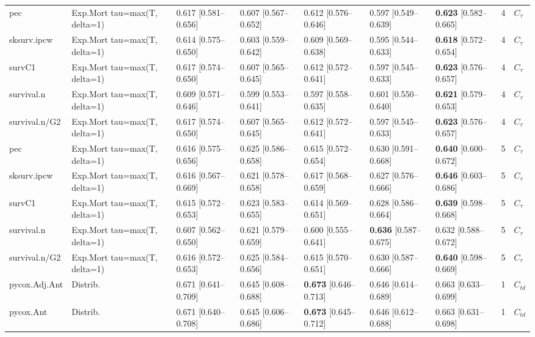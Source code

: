 \begin{tabular}{lllllllrl}
\addlinespace
pec & Exp.Mort tau=max(T, delta=1) & 0.617 [0.581–0.656] & 0.607 [0.567–0.652] & 0.612 [0.576–0.646] & 0.597 [0.549–0.639] & \textbf{0.623} [0.582–0.665] & 4 & $C_{\tau}$\\
sksurv.ipcw & Exp.Mort tau=max(T, delta=1) & 0.614 [0.575–0.650] & 0.603 [0.559–0.642] & 0.609 [0.569–0.638] & 0.595 [0.544–0.633] & \textbf{0.618} [0.572–0.654] & 4 & $C_{\tau}$\\
survC1 & Exp.Mort tau=max(T, delta=1) & 0.617 [0.574–0.650] & 0.607 [0.565–0.645] & 0.612 [0.572–0.641] & 0.597 [0.545–0.633] & \textbf{0.623} [0.576–0.657] & 4 & $C_{\tau}$\\
survival.n & Exp.Mort tau=max(T, delta=1) & 0.609 [0.571–0.646] & 0.599 [0.553–0.641] & 0.597 [0.558–0.635] & 0.601 [0.550–0.640] & \textbf{0.621} [0.579–0.653] & 4 & $C_{\tau}$\\
survival.n/G2 & Exp.Mort tau=max(T, delta=1) & 0.617 [0.574–0.650] & 0.607 [0.565–0.645] & 0.612 [0.572–0.641] & 0.597 [0.545–0.633] & \textbf{0.623} [0.576–0.657] & 4 & $C_{\tau}$\\
\addlinespace
pec & Exp.Mort tau=max(T, delta=1) & 0.616 [0.575–0.656] & 0.625 [0.586–0.658] & 0.615 [0.572–0.654] & 0.630 [0.591–0.668] & \textbf{0.640} [0.600–0.672] & 5 & $C_{\tau}$\\
sksurv.ipcw & Exp.Mort tau=max(T, delta=1) & 0.616 [0.567–0.669] & 0.621 [0.578–0.658] & 0.617 [0.568–0.659] & 0.627 [0.576–0.666] & \textbf{0.646} [0.603–0.686] & 5 & $C_{\tau}$\\
survC1 & Exp.Mort tau=max(T, delta=1) & 0.615 [0.572–0.653] & 0.623 [0.583–0.655] & 0.614 [0.569–0.651] & 0.628 [0.586–0.664] & \textbf{0.639} [0.598–0.668] & 5 & $C_{\tau}$\\
survival.n & Exp.Mort tau=max(T, delta=1) & 0.607 [0.562–0.650] & 0.621 [0.579–0.659] & 0.600 [0.555–0.641] & \textbf{0.636} [0.587–0.675] & 0.632 [0.588–0.672] & 5 & $C_{\tau}$\\
survival.n/G2 & Exp.Mort tau=max(T, delta=1) & 0.616 [0.572–0.653] & 0.625 [0.584–0.656] & 0.615 [0.570–0.651] & 0.630 [0.587–0.666] & \textbf{0.640} [0.598–0.669] & 5 & $C_{\tau}$\\
\addlinespace
pycox.Adj.Ant & Distrib. & 0.671 [0.641–0.709] & 0.645 [0.608–0.688] & \textbf{0.673} [0.646–0.713] & 0.646 [0.614–0.689] & 0.663 [0.633–0.699] & 1 & $C_{td}$\\
pycox.Ant & Distrib. & 0.671 [0.640–0.708] & 0.645 [0.606–0.686] & \textbf{0.673} [0.645–0.712] & 0.646 [0.612–0.688] & 0.663 [0.631–0.698] & 1 & $C_{td}$\\

\end{tabular}
